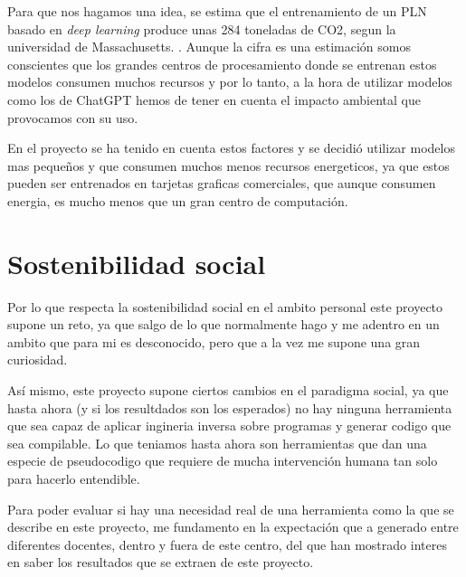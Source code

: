 Para que nos hagamos una idea, se estima que el entrenamiento de un PLN basado en \textit{deep learning} produce unas 284 toneladas de CO2, segun la universidad de Massachusetts.
\cite{Artículo_doctrinal}. Aunque la cifra es una estimación somos conscientes que los grandes centros de procesamiento donde se entrenan estos modelos consumen muchos recursos y por lo tanto, a 
la hora de utilizar modelos como los de ChatGPT hemos de tener en cuenta el impacto ambiental que provocamos con su uso.

En el proyecto se ha tenido en cuenta estos factores y se decidió utilizar modelos mas pequeños y que consumen muchos menos recursos energeticos, ya que estos pueden ser entrenados
en tarjetas graficas comerciales, que aunque consumen energia, es mucho menos que un gran centro de computación.

\section{Sostenibilidad social}
\label{sec:sostenibilidad_social}

Por lo que respecta la sostenibilidad social en el ambito personal este proyecto supone un reto, ya que salgo de lo que normalmente hago y me adentro en un ambito que 
para mi es desconocido, pero que a la vez me supone una gran curiosidad.

Así mismo, este proyecto supone ciertos cambios en el paradigma social, ya que hasta ahora (y si los resultdados son los esperados) no hay ninguna herramienta que sea
capaz de aplicar ingineria inversa sobre programas y generar codigo que sea compilable. Lo que teniamos hasta ahora son herramientas que dan una especie de pseudocodigo que 
requiere de mucha intervención humana tan solo para hacerlo entendible.

Para poder evaluar si hay una necesidad real de una herramienta como la que se describe en este proyecto, me fundamento en la expectación que a generado entre diferentes docentes, dentro y
fuera de este centro, del que han mostrado interes en saber los resultados que se extraen de este proyecto.
